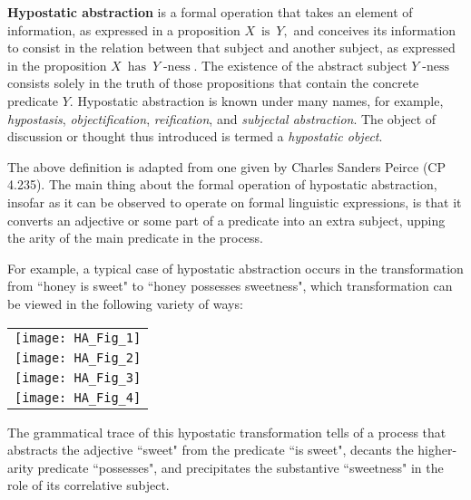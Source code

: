 \documentclass[12pt]{article}
\begin{document}

\textbf{Hypostatic abstraction} is a formal operation that takes an element of information, as expressed in a proposition $X\ \operatorname{is}\ Y,$ and conceives its information to consist in the relation between that subject and another subject, as expressed in the proposition $X\ \operatorname{has}\ Y\!\operatorname{-ness}.$  The existence of the abstract subject $Y\!\operatorname{-ness}$ consists solely in the truth of those propositions that contain the concrete predicate $Y.$  Hypostatic abstraction is known under many names, for example, \textit{hypostasis}, \textit{objectification}, \textit{reification}, and \textit{subjectal abstraction}.  The object of discussion or thought thus introduced is termed a \textit{hypostatic object}.

The above definition is adapted from one given by Charles Sanders Peirce (CP 4.235).  The main thing about the formal operation of hypostatic abstraction, insofar as it can be observed to operate on formal linguistic expressions, is that it converts an adjective or some part of a predicate into an extra subject, upping the arity of the main predicate in the process.

For example, a typical case of hypostatic abstraction occurs in the transformation from ``honey is sweet" to ``honey possesses sweetness", which transformation can be viewed in the following variety of ways:

\begin{center}\begin{tabular}{c}
\texttt{[image: HA\_Fig\_1]}
\\[24pt]
\texttt{[image: HA\_Fig\_2]}
\\[24pt]
\texttt{[image: HA\_Fig\_3]}
\\[24pt]
\texttt{[image: HA\_Fig\_4]}
\end{tabular}\end{center}

The grammatical trace of this hypostatic transformation tells of a process that abstracts the adjective ``sweet" from the predicate ``is sweet", decants the higher-arity predicate ``possesses", and precipitates the substantive ``sweetness" in the role of its correlative subject.
\end{document}

